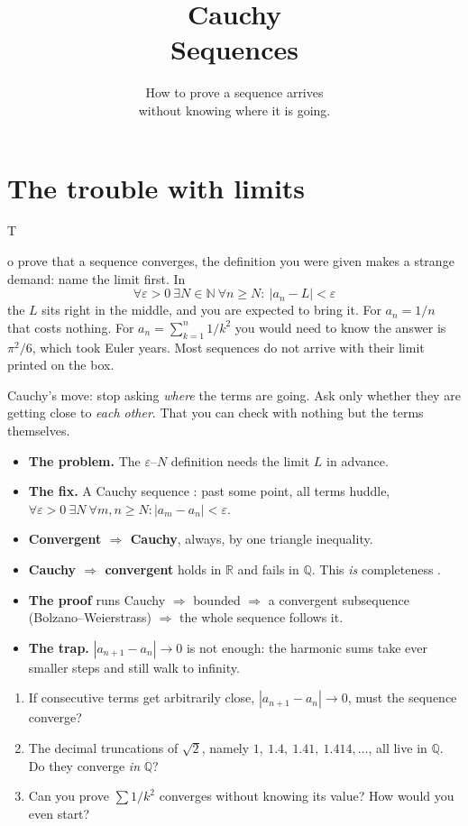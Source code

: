 \documentclass{kaelearn}
\title{Cauchy\\Sequences}
\subtitle{How to prove a sequence arrives\\without knowing where it is going.}
\begin{document}
\makecover

\section{The trouble with limits}

\opening{T}{o prove} that a sequence converges, the definition you were given makes a strange demand: name the limit first. In
\[
  \forall \varepsilon > 0\ \exists N \in \mathbb{N}\ \forall n \ge N:\ |a_n - L| < \varepsilon
\]
the $L$ sits right in the middle, and you are expected to bring it. For $a_n = 1/n$ that costs nothing. For
$a_n = \sum_{k=1}^{n} 1/k^2$ you would need to know the answer is $\pi^2/6$, which took Euler years. Most sequences do not arrive with
their limit printed on the box.

Cauchy's move: stop asking \emph{where} the terms are going. Ask only whether they are getting close to \emph{each other}. That you can
check with nothing but the terms themselves.

\begin{twominute}
\begin{itemize}
  \item \textbf{The problem.} The $\varepsilon$--$N$ definition needs the limit $L$ in advance.
  \item \textbf{The fix.} A Cauchy sequence : past some point, all terms huddle,
        $\forall\varepsilon>0\ \exists N\ \forall m,n\ge N: |a_m-a_n|<\varepsilon$.
  \item \textbf{Convergent $\Rightarrow$ Cauchy}, always, by one triangle inequality.
  \item \textbf{Cauchy $\Rightarrow$ convergent} holds in $\mathbb{R}$ and fails in $\mathbb{Q}$. This \emph{is} completeness .
  \item \textbf{The proof} runs Cauchy $\Rightarrow$ bounded $\Rightarrow$ a convergent subsequence (Bolzano--Weierstrass) $\Rightarrow$ the whole sequence follows it.
  \item \textbf{The trap.} $|a_{n+1}-a_n|\to 0$ is not enough: the harmonic sums take ever smaller steps and still walk to infinity.
\end{itemize}
\end{twominute}

\begin{guessfirst}
\begin{enumerate}
  \item If consecutive terms get arbitrarily close, $|a_{n+1}-a_n| \to 0$, must the sequence converge?
  \item The decimal truncations of $\sqrt2$, namely $1,\ 1.4,\ 1.41,\ 1.414,\dots$, all live in $\mathbb{Q}$. Do they converge \emph{in} $\mathbb{Q}$?
  \item Can you prove $\sum 1/k^2$ converges without knowing its value? How would you even start?
\end{enumerate}
\end{guessfirst}
\end{document}
